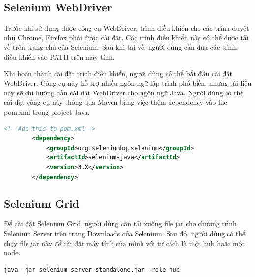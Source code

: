\documentclass[./../main_file.tex]{subfiles}
\begin{document}
	\subsection{Selenium WebDriver}
	
	Trước khi sử dụng được công cụ WebDriver, trình điều khiển cho các trình duyệt như Chrome, Firefox phải được cài đặt. Các trình điều khiển này có thể được tải về trên trang chủ của Selenium. Sau khi tải về, người dùng cần đưa các trình điều khiển vào PATH trên máy tính.
	
	Khi hoàn thành cài đặt trình điều khiển, người dùng có thể bắt đầu cài đặt WebDriver. Công cụ này hỗ trợ nhiều ngôn ngữ lập trình phổ biến, nhưng tài liệu này sẽ chỉ hướng dẫn cài đặt WebDriver cho ngôn ngữ Java. Người dùng có thể cài đặt công cụ này thông qua Maven bằng việc thêm dependency vào file pom.xml trong project Java.
	
	\begin{lstlisting}[language=XML,caption=pom.xml]
		<!--Add this to pom.xml-->
		<dependency>
			<groupId>org.seleniumhq.selenium</groupId>
			<artifactId>selenium-java</artifactId>
			<version>3.X</version>
		</dependency>
	\end{lstlisting}

	\subsection{Selenium Grid}
	
	Để cài đặt Selenium Grid, người dùng cần tải xuống file jar cho chương trình Selenium Server trên trang Downloads của Selenium. Sau đó, người dùng có thể chạy file jar này để cài đặt máy tính của mình với tư cách là một hub hoặc một node.
	
	\begin{lstlisting}[caption=Lệnh để chạy Selenium Server]
		java -jar selenium-server-standalone.jar -role hub
	\end{lstlisting}
	
\end{document}
